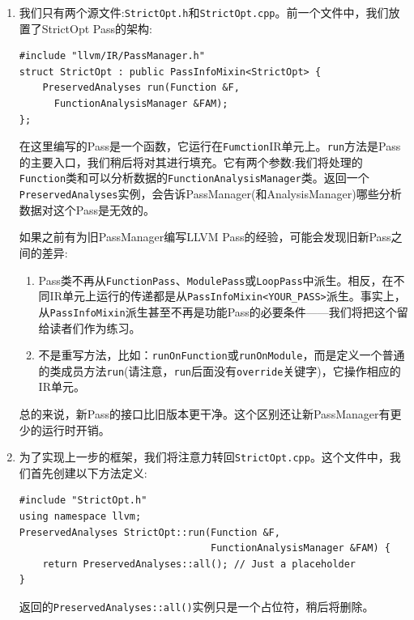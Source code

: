 \begin{enumerate}
\item 我们只有两个源文件:\texttt{StrictOpt.h}和\texttt{StrictOpt.cpp}。前一个文件中，我们放置了StrictOpt Pass的架构:

\begin{lstlisting}[style=styleCXX]
#include "llvm/IR/PassManager.h"
struct StrictOpt : public PassInfoMixin<StrictOpt> {
	PreservedAnalyses run(Function &F,
	  FunctionAnalysisManager &FAM);
};
\end{lstlisting}

在这里编写的Pass是一个函数，它运行在\texttt{Fumction}IR单元上。\texttt{run}方法是Pass的主要入口，我们稍后将对其进行填充。它有两个参数:我们将处理的\texttt{Function}类和可以分析数据的\texttt{FunctionAnalysisManager}类。返回一个\texttt{PreservedAnalyses}实例，会告诉PassManager(和AnalysisManager)哪些分析数据对这个Pass是无效的。

如果之前有为旧PassManager编写LLVM Pass的经验，可能会发现旧新Pass之间的差异:

\begin{enumerate}[label=\alph*)]
\item Pass类不再从\texttt{FunctionPass}、\texttt{ModulePass}或\texttt{LoopPass}中派生。相反，在不同IR单元上运行的传递都是从\texttt{PassInfoMixin<YOUR\_PASS>}派生。事实上，从\texttt{PassInfoMixin}派生甚至不再是功能Pass的必要条件——我们将把这个留给读者们作为练习。

\item 不是重写方法，比如：\texttt{runOnFunction}或\texttt{runOnModule}，而是定义一个普通的类成员方法\texttt{run}(请注意，\texttt{run}后面没有\texttt{override}关键字)，它操作相应的IR单元。

\end{enumerate}

总的来说，新Pass的接口比旧版本更干净。这个区别还让新PassManager有更少的运行时开销。

\item 为了实现上一步的框架，我们将注意力转回\texttt{StrictOpt.cpp}。这个文件中，我们首先创建以下方法定义:

\begin{lstlisting}[style=styleCXX]
#include "StrictOpt.h"
using namespace llvm;
PreservedAnalyses StrictOpt::run(Function &F,
                                 FunctionAnalysisManager &FAM) {
	return PreservedAnalyses::all(); // Just a placeholder
}
\end{lstlisting}

返回的\texttt{PreservedAnalyses::all()}实例只是一个占位符，稍后将删除。


\end{enumerate}
